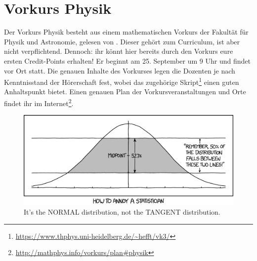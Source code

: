 \section{Vorkurs Physik}
Der Vorkurs Physik besteht aus einem mathematischen Vorkurs der Fakultät für Physik und Astronomie, gelesen von \dozentvorkurs. Dieser gehört zum Curriculum, ist aber nicht verpflichtend. Dennoch: ihr könnt hier bereits durch den Vorkurs eure ersten Credit-Points erhalten! Er beginnt am 25. September um 9 Uhr und findet vor Ort statt. Die genauen Inhalte des Vorkurses legen die Dozenten je nach Kenntnisstand der Hörerschaft fest, wobei das zugehörige Skript\footnote{\url{https://www.thphys.uni-heidelberg.de/~hefft/vk3/}} einen guten Anhaltspunkt bietet. Einen genauen Plan der Vorkursveranstaltungen und Orte findet ihr im Internet\footnote{\url{http://mathphys.info/vorkurs/plan\#physik}}.


\begin{figure}[!b]
    \centering
    \includegraphics[width=\textwidth]{bilder/normal_distribution_2x.png}
    \caption*{It's the NORMAL distribution, not the TANGENT distribution.}
\end{figure}
